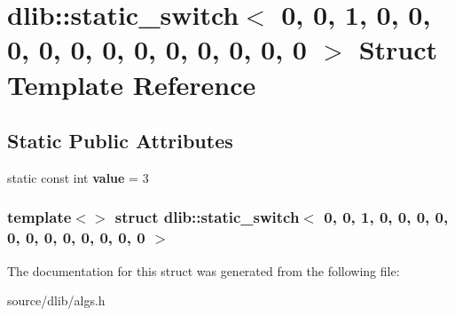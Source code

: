 \hypertarget{structdlib_1_1static__switch_3_010_00_010_00_011_00_010_00_010_00_010_00_010_00_010_00_010_00_01f20039fe97478cfcdfb8a6fb10d88c23}{
\section{dlib::static\_\-switch$<$ 0, 0, 1, 0, 0, 0, 0, 0, 0, 0, 0, 0, 0, 0, 0 $>$ Struct Template Reference}
\label{structdlib_1_1static__switch_3_010_00_010_00_011_00_010_00_010_00_010_00_010_00_010_00_010_00_01f20039fe97478cfcdfb8a6fb10d88c23}
}
\subsection*{Static Public Attributes}
\begin{DoxyCompactItemize}
\item 
\hypertarget{structdlib_1_1static__switch_3_010_00_010_00_011_00_010_00_010_00_010_00_010_00_010_00_010_00_01f20039fe97478cfcdfb8a6fb10d88c23_a1fc5d4f9f68e19ee7b9b03e3f6abd412}{
static const int {\bfseries value} = 3}
\label{structdlib_1_1static__switch_3_010_00_010_00_011_00_010_00_010_00_010_00_010_00_010_00_010_00_01f20039fe97478cfcdfb8a6fb10d88c23_a1fc5d4f9f68e19ee7b9b03e3f6abd412}

\end{DoxyCompactItemize}
\subsubsection*{template$<$$>$ struct dlib::static\_\-switch$<$ 0, 0, 1, 0, 0, 0, 0, 0, 0, 0, 0, 0, 0, 0, 0 $>$}



The documentation for this struct was generated from the following file:\begin{DoxyCompactItemize}
\item 
source/dlib/algs.h\end{DoxyCompactItemize}
